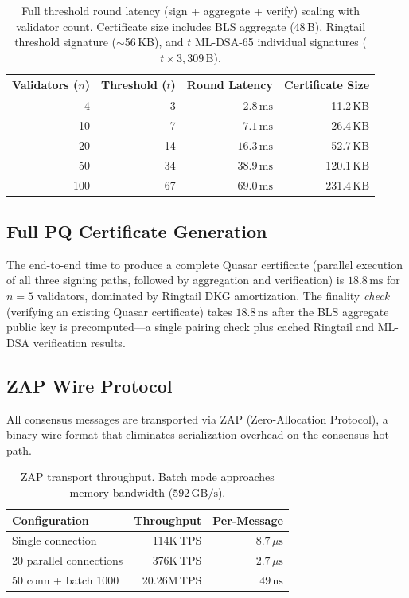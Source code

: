 \begin{table}[ht]
\centering
\begin{tabular}{@{}rrrr@{}}
\toprule
\textbf{Validators ($n$)} & \textbf{Threshold ($t$)} &
\textbf{Round Latency} & \textbf{Certificate Size} \\
\midrule
4   & 3   & $2.8\,\text{ms}$  & 11.2\,KB \\
10  & 7   & $7.1\,\text{ms}$  & 26.4\,KB \\
20  & 14  & $16.3\,\text{ms}$ & 52.7\,KB \\
50  & 34  & $38.9\,\text{ms}$ & 120.1\,KB \\
100 & 67  & $69.0\,\text{ms}$ & 231.4\,KB \\
\bottomrule
\end{tabular}
\caption{Full threshold round latency (sign + aggregate + verify) scaling
with validator count. Certificate size includes BLS aggregate (48\,B),
Ringtail threshold signature ($\sim$56\,KB), and $t$ ML-DSA-65 individual
signatures ($t \times 3{,}309$\,B).}
\label{tab:threshold}
\end{table}

\subsection{Full PQ Certificate Generation}

The end-to-end time to produce a complete Quasar certificate (parallel
execution of all three signing paths, followed by aggregation and
verification) is $18.8\,\text{ms}$ for $n = 5$ validators, dominated by
Ringtail DKG amortization. The finality \emph{check} (verifying an existing
Quasar certificate) takes $18.8\,\text{ns}$ after the BLS aggregate public
key is precomputed---a single pairing check plus cached Ringtail and ML-DSA
verification results.

\subsection{ZAP Wire Protocol}

All consensus messages are transported via ZAP (Zero-Allocation Protocol),
a binary wire format that eliminates serialization overhead on the
consensus hot path.

\begin{table}[ht]
\centering
\begin{tabular}{@{}lrr@{}}
\toprule
\textbf{Configuration} & \textbf{Throughput} & \textbf{Per-Message} \\
\midrule
Single connection       & 114K\,TPS   & $8.7\,\mu\text{s}$ \\
20 parallel connections & 376K\,TPS   & $2.7\,\mu\text{s}$ \\
50 conn + batch 1000    & 20.26M\,TPS & $49\,\text{ns}$ \\
\bottomrule
\end{tabular}
\caption{ZAP transport throughput. Batch mode approaches memory bandwidth
($592\,\text{GB/s}$).}
\label{tab:zap}
\end{table}

